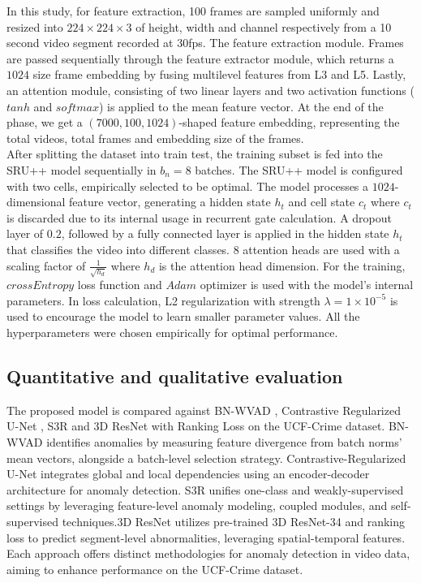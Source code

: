 \documentclass[runningheads]{llncs}
\begin{document}
In this study, for feature extraction, 100 frames are sampled uniformly and resized into $224 \times 224 \times 3$ of height, width and channel respectively from a 10 second video segment recorded at 30fps. The feature extraction module. Frames are passed sequentially through the feature extractor module, which returns a $1024$ size frame embedding by fusing multilevel features from L3 and L5. Lastly, an attention module, consisting of two linear layers and two activation functions ($tanh$ and $softmax$) is applied to the mean feature vector. At the end of the phase, we get a $(7000, 100, 1024)$-shaped feature embedding, representing the total videos, total frames and embedding size of the frames. \\

After splitting the dataset into train test, the training subset  is fed into the SRU++ model sequentially in $b_n = 8$ batches. The SRU++ model is configured with two cells, empirically selected to be optimal. The model processes a $1024$-dimensional feature vector, generating a hidden state $h_t$ and cell state $c_t$ where $c_t$ is discarded due to its internal usage in recurrent gate calculation. A dropout layer of $0.2$, followed by a fully connected layer is applied in the hidden state $h_t$ that classifies the video into different classes. 8 attention heads are used with a scaling factor of $\frac{1}{\sqrt{h_d}}$ where $h_d$ is the attention head dimension. For the training, $crossEntropy$ loss function and $Adam$ optimizer is used with the model’s internal parameters. In loss calculation, L2 regularization with strength $\lambda = 1 \times 10^{-5}$ is used to encourage the model to learn smaller parameter values. All the hyperparameters were chosen empirically for optimal performance. 

\subsection{Quantitative and qualitative evaluation}

The proposed model is compared against BN-WVAD \cite{zhou2023batchnorm}, Contrastive Regularized U-Net \cite{gan2023contrastive}, S3R \cite{wu2022self} and 3D ResNet with  Ranking Loss \cite{dubey20193d} on the UCF-Crime dataset. BN-WVAD identifies anomalies by measuring  feature divergence from batch norms' mean vectors, alongside a batch-level selection strategy. Contrastive-Regularized  U-Net integrates global and local dependencies using an encoder-decoder architecture for anomaly detection. S3R unifies one-class and weakly-supervised settings by leveraging feature-level anomaly modeling, coupled modules, and self-supervised techniques.3D  ResNet utilizes pre-trained 3D ResNet-34 and ranking loss to predict  segment-level abnormalities, leveraging spatial-temporal features. Each approach offers  distinct methodologies for anomaly detection in video data, aiming to enhance performance on the UCF-Crime dataset.\\
\end{document}

